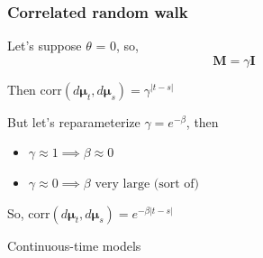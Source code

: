 \documentclass[36pt,handout]{beamer}
\newcommand{\ft}[1]{\frametitle{#1}}
\newcommand{\bmu}{\boldsymbol{\mu}}
\begin{document}

\begin{frame}
\ft{Correlated random walk}
Let's suppose $\theta$ = 0, so,
$$\mathbf{M} = \gamma \mathbf{I}$$
\medskip

Then $\mbox{corr}(d\bmu_t, d\bmu_s) = \gamma^{|t-s|}$
\bigskip

\pause

But let's reparameterize $\gamma = e^{-\beta}$, then 
\begin{itemize}
\item $\gamma \approx 1 \implies \beta \approx 0$ 
\item $\gamma \approx 0 \implies \beta \mbox{ very large (sort of)}$ 
\end{itemize}

So, $\mbox{corr}(d\bmu_t, d\bmu_s) = e^{-\beta|t-s|}$

\end{frame}


{
\begin{frame}[t]
\end{frame}
}


{
\begin{frame}
\textcolor{noaaturq}{\Huge Continuous-time models}
\end{frame}
}
\end{document}
